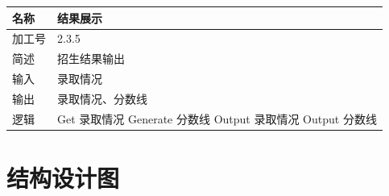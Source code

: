 \documentclass[CJK,utf8]{ctexrep}
\begin{document}
\begin{tabularx}{0.85\textwidth}{|l|X|}
	\hline
	\textbf{名称} & \textbf{结果展示} \\
	\hline
	加工号 & 2.3.5 \\
	\hline
	简述 & 招生结果输出 \\
	\hline
	输入 & 录取情况 \\
	\hline
	输出 & 录取情况、分数线 \\
	\hline
	\multirow{4}{*}{逻辑} & \ttfamily
	Get 录取情况 \newline
	Generate 分数线 \newline
	Output 录取情况 \newline
	Output 分数线\\
	\hline
\end{tabularx}

\section*{结构设计图}
\end{document}
